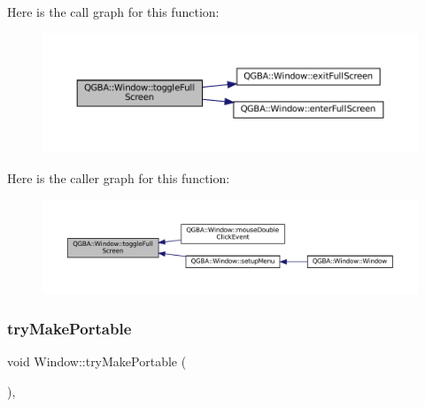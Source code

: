 Here is the call graph for this function\+:
\nopagebreak
\begin{figure}[H]
\begin{center}
\leavevmode
\includegraphics[width=350pt]{class_q_g_b_a_1_1_window_a4528810005bb005d12e41f0801e8b373_cgraph}
\end{center}
\end{figure}
Here is the caller graph for this function\+:
\nopagebreak
\begin{figure}[H]
\begin{center}
\leavevmode
\includegraphics[width=350pt]{class_q_g_b_a_1_1_window_a4528810005bb005d12e41f0801e8b373_icgraph}
\end{center}
\end{figure}
\mbox{\label{class_q_g_b_a_1_1_window_aca690184ec03e5491f7910a37001cf26}} 
\subsubsection{\texorpdfstring{try\+Make\+Portable}{tryMakePortable}}
{\footnotesize\ttfamily void Window\+::try\+Make\+Portable (\begin{DoxyParamCaption}{ }\end{DoxyParamCaption})\hspace{0.3cm}{\ttfamily [private]}, {\ttfamily [slot]}}

